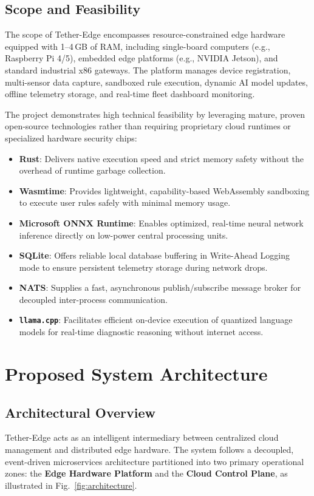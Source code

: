 \documentclass[conference]{IEEEtran}
\begin{document}
    \subsection{Scope and Feasibility}
    The scope of Tether-Edge encompasses resource-constrained edge hardware equipped with 1--4\,GB of RAM, including single-board computers (e.g., Raspberry Pi
    4/5), embedded edge platforms (e.g., NVIDIA Jetson), and standard industrial x86 gateways. The platform manages device registration, multi-sensor data capture,
    sandboxed rule execution, dynamic AI model updates, offline telemetry storage, and real-time fleet dashboard monitoring.

    The project demonstrates high technical feasibility by leveraging mature, proven open-source technologies rather than requiring proprietary cloud runtimes or
    specialized hardware security chips:
    \begin{itemize}
        \item \textbf{Rust}: Delivers native execution speed and strict memory safety without the overhead of runtime garbage collection.
        \item \textbf{Wasmtime}: Provides lightweight, capability-based WebAssembly sandboxing to execute user rules safely with minimal memory usage.
        \item \textbf{Microsoft ONNX Runtime}: Enables optimized, real-time neural network inference directly on low-power central processing units.
        \item \textbf{SQLite}: Offers reliable local database buffering in Write-Ahead Logging mode to ensure persistent telemetry storage during network drops.
        \item \textbf{NATS}: Supplies a fast, asynchronous publish/subscribe message broker for decoupled inter-process communication.
        \item \textbf{\texttt{llama.cpp}}: Facilitates efficient on-device execution of quantized language models for real-time diagnostic reasoning without
        internet access.
    \end{itemize}

    \section{Proposed System Architecture}

    \subsection{Architectural Overview}
    Tether-Edge acts as an intelligent intermediary between centralized cloud management and distributed edge hardware. The system follows a decoupled,
    event-driven microservices architecture partitioned into two primary operational zones: the \textbf{Edge Hardware Platform} and the \textbf{Cloud Control
    Plane}, as illustrated in Fig.~\ref{fig:architecture}.
\end{document}
